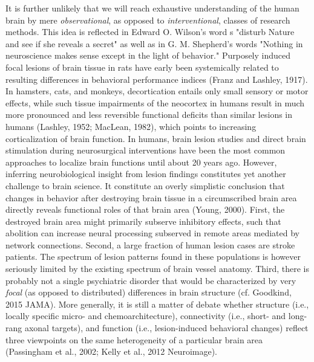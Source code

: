 \documentclass[authoryear,review,3p]{elsarticle}
\begin{document}
It is further unlikely that we
will reach exhaustive understanding of
the human brain by mere
\textit{observational}, as opposed to \textit{interventional},
classes of research methods.
This idea is reflected in
Edward O. Wilson's word s
"disturb Nature and see if she reveals a secret"
as well as in
G. M. Shepherd's words
"Nothing in neuroscience makes sense except in the light of behavior."
%
Purposely induced focal lesions of brain tissue in rats have early
been systemically related to resulting differences in
behavioral performance indices
(Franz and Lashley, 1917).
In hamsters, cats, and monkeys,
decortication entails only small sensory or motor effects,
while such tissue impairments of the neocortex in humans
result in much more pronounced and less reversible 
functional deficits than similar lesions in humans
(Lashley, 1952; MacLean, 1982),
which points to increasing corticalization of brain function.
In humans, brain lesion studies and direct brain stimulation during
neurosurgical interventions have been
the most common approaches
to localize brain functions
until about 20 years ago.
%
However, inferring neurobiological insight from lesion findings constitutes
yet another challenge to brain science.
It constitute an overly simplistic conclusion that
changes in behavior after destroying brain tissue in a
circumscribed brain area directly reveals functional roles
of that brain area (Young, 2000).
%
First,
the destroyed brain area might  primarily subserve inhibitory effects,
such that abolition can increase neural processing subserved in remote areas
mediated by network connections.
Second,
a large fraction of human lesion cases are stroke patients.
The spectrum of lesion patterns found in these populations
is however seriously limited by the existing spectrum of
brain vessel anatomy.
Third,
there is probably not a single psychiatric disorder that would be
characterized by very \textit{focal} (as opposed to distributed)
differences in brain structure
(cf. Goodkind, 2015 JAMA).
%
More generally, it is still a matter of debate whether
structure (i.e., locally specific micro- and chemoarchitecture),
connectivity (i.e., short- and long-rang axonal targets),
and function (i.e., lesion-induced behavioral changes)
reflect three  viewpoints on the same heterogeneity of
a particular brain area
(Passingham et al., 2002; Kelly et al., 2012 Neuroimage).
\end{document}
